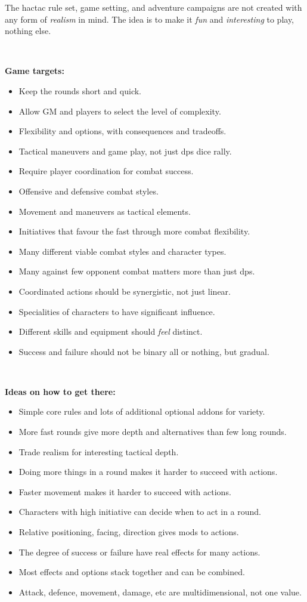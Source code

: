 The hactac rule set, game setting, and adventure campaigns are not created with any form of \emph{realism} in mind. The idea is to make it \emph{fun} and \emph{interesting} to play, nothing else.

\

\textbf{Game targets:}
\begin{itemize}
    \item Keep the rounds short and quick.
    \item Allow GM and players to select the level of complexity.
    \item Flexibility and options, with consequences and tradeoffs.
    \item Tactical maneuvers and game play, not just dps dice rally.
    \item Require player coordination for combat success.
    \item Offensive and defensive combat styles.
    \item Movement and maneuvers as tactical elements.
    \item Initiatives that favour the fast through more combat flexibility.
    \item Many different viable combat styles and character types.
    \item Many against few opponent combat matters more than just dps.
    \item Coordinated actions should be synergistic, not just linear.
    \item Specialities of characters to have significant influence.
    \item Different skills and equipment should \emph{feel} distinct.
    \item Success and failure should not be binary all or nothing, but gradual.
\end{itemize}

\

\textbf{Ideas on how to get there:}
\begin{itemize}
    \item Simple core rules and lots of additional optional addons for variety.
    \item More fast rounds give more depth and alternatives than few long rounds.
    \item Trade realism for interesting tactical depth.
    \item Doing more things in a round makes it harder to succeed with actions.
    \item Faster movement makes it harder to succeed with actions.
    \item Characters with high initiative can decide when to act in a round.
    \item Relative positioning, facing, direction gives mods to actions.
    \item The degree of success or failure have real effects for many actions.
    \item Most effects and options stack together and can be combined.
    \item Attack, defence, movement, damage, etc are multidimensional, not one value.
\end{itemize}


